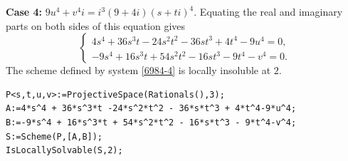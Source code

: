 \documentclass[a4paper,12pt,english,reqno]{amsart}
\begin{document}
{\bf Case 4:}  $9u^4+v^4i=i^3(9+4i)(s+ti)^4$. Equating the real and imaginary parts on both sides of this equation gives
\begin{equation}\label{6984-4}
\begin{cases}
4s^4 + 36s^3t - 24s^2t^2 - 36st^3 + 4t^4 - 9u^4=0,\\
-9s^4 + 16s^3t + 54s^2t^2 - 16st^3 - 9t^4 - v^4=0.
\end{cases}
\end{equation}
The scheme defined by system \eqref{6984-4} is locally insoluble at $2$.
%

\begin{lstlisting}
P<s,t,u,v>:=ProjectiveSpace(Rationals(),3);
A:=4*s^4 + 36*s^3*t -24*s^2*t^2 - 36*s*t^3 + 4*t^4-9*u^4;
B:=-9*s^4 + 16*s^3*t + 54*s^2*t^2 - 16*s*t^3 - 9*t^4-v^4;
S:=Scheme(P,[A,B]);
IsLocallySolvable(S,2);
\end{lstlisting}
\end{document}
